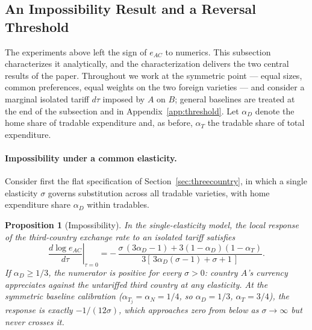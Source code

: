 \documentclass[11pt]{article}
\theoremstyle{plain}
\newtheorem{proposition}{Proposition}
\theoremstyle{remark}
\numberwithin{lemma}{section}
\numberwithin{proposition}{section}
\numberwithin{corollary}{section}
\newenvironment{revblock}{\par\begingroup\color{RevBlue}}{\endgroup\par}
\begin{document}
\begin{revblock}
\subsection{An Impossibility Result and a Reversal Threshold}
\label{sec:impossibility}

The experiments above left the sign of $e_{AC}$ to numerics. This subsection characterizes it analytically, and the characterization delivers the two central results of the paper. Throughout we work at the symmetric point --- equal sizes, common preferences, equal weights on the two foreign varieties --- and consider a marginal isolated tariff $d\tau$ imposed by $A$ on $B$; general baselines are treated at the end of the subsection and in Appendix~\ref{app:threshold}. Let $\alpha_D$ denote the home share of tradable expenditure and, as before, $\alpha_T$ the tradable share of total expenditure.

\paragraph{Impossibility under a common elasticity.} Consider first the flat specification of Section~\ref{sec:threecountry}, in which a single elasticity $\sigma$ governs substitution across all tradable varieties, with home expenditure share $\alpha_D$ within tradables.

\begin{proposition}[Impossibility]
\label{prop:impossibility}
In the single-elasticity model, the local response of the third-country exchange rate to an isolated tariff satisfies
\[
\left.\frac{d \log e_{AC}}{d\tau}\right|_{\tau=0}
= -\,\frac{\sigma\,(3\alpha_D - 1) + 3(1-\alpha_D)(1-\alpha_T)}{3\left[\,3\alpha_D(\sigma-1) + \sigma + 1\,\right]} .
\]
If $\alpha_D \ge 1/3$, the numerator is positive for every $\sigma > 0$: country $A$'s currency appreciates against the untariffed third country at any elasticity. At the symmetric baseline calibration ($\alpha_{T_j} = \alpha_N = 1/4$, so $\alpha_D = 1/3$, $\alpha_T = 3/4$), the response is exactly $-1/(12\sigma)$, which approaches zero from below as $\sigma \to \infty$ but never crosses it.
\end{proposition}


\end{revblock}
\end{document}

